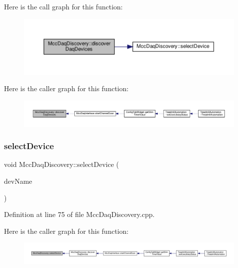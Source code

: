 Here is the call graph for this function\+:
\nopagebreak
\begin{figure}[H]
\begin{center}
\leavevmode
\includegraphics[width=350pt]{class_mcc_daq_discovery_a9b2541fefb5156e2412f4e3eb34eed72_cgraph}
\end{center}
\end{figure}
Here is the caller graph for this function\+:
\nopagebreak
\begin{figure}[H]
\begin{center}
\leavevmode
\includegraphics[width=350pt]{class_mcc_daq_discovery_a9b2541fefb5156e2412f4e3eb34eed72_icgraph}
\end{center}
\end{figure}
\mbox{\label{class_mcc_daq_discovery_a658426719d9987f48626708d42397a9e}} 
\subsubsection{\texorpdfstring{select\+Device}{selectDevice}}
{\footnotesize\ttfamily void Mcc\+Daq\+Discovery\+::select\+Device (\begin{DoxyParamCaption}\item[{Q\+String}]{dev\+Name }\end{DoxyParamCaption})\hspace{0.3cm}{\ttfamily [slot]}}



Definition at line 75 of file Mcc\+Daq\+Discovery.\+cpp.

Here is the caller graph for this function\+:
\nopagebreak
\begin{figure}[H]
\begin{center}
\leavevmode
\includegraphics[width=350pt]{class_mcc_daq_discovery_a658426719d9987f48626708d42397a9e_icgraph}
\end{center}
\end{figure}
\mbox{\label{class_mcc_daq_discovery_aca6d5d7d2f0367de427d43b3947ea9df}} 
